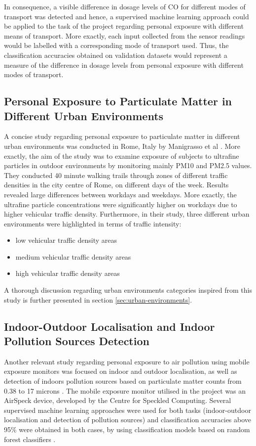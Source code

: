 \documentclass[bsc,frontabs,twoside,singlespacing, parskip,deptreport]{infthesis}     %
\begin{document}
In consequence, a visible difference in dosage levels of CO for different modes of transport was detected and hence, a supervised machine learning approach could be applied to the task of the project regarding personal exposure with different means of transport. More exactly, each input collected from the sensor readings would be labelled with a corresponding mode of transport used. Thus, the classification accuracies obtained on validation datasets would represent a measure of the difference in dosage levels from personal exposure with different modes of transport.

\subsection{Personal Exposure to Particulate Matter in Different Urban Environments}

A concise study regarding personal exposure to particulate matter in different urban environments was conducted in Rome, Italy by Manigrasso et al \cite{rome2017}. More exactly, the aim of the study was to examine exposure of subjects to ultrafine particles in outdoor environments by monitoring mainly PM10 and PM2.5 values. They conducted 40 minute walking trails through zones of different traffic densities in the city centre of Rome, on different days of the week. Results revealed large differences between workdays and weekdays. More exactly, the ultrafine particle concentrations were significantly higher on workdays due to higher vehicular traffic density. Furthermore,  in their study, three different urban environments were highlighted in terms of traffic intensity:
\begin{itemize}
\item low vehicular traffic density areas
\item medium vehicular traffic density areas
\item high vehicular traffic density areas
\end{itemize}
A thorough discussion regarding urban environments categories inspired from this study is further presented in section \ref{sec:urban-environments}.

\subsection{Indoor-Outdoor Localisation and Indoor Pollution Sources Detection}

Another relevant study regarding personal exposure to air pollution using mobile exposure monitors was focused on indoor and outdoor localisation, as well as detection of indoors pollution sources based on particulate matter counts from 0.38 to 17 microns \cite{buzatu2018}. The mobile exposure monitor utilised in the project was an AirSpeck device, developed by the Centre for Speckled Computing. Several supervised machine learning approaches were used for both tasks (indoor-outdoor localisation and detection of pollution sources) and classification accuracies above 95\% were obtained in both cases, by using classification models based on random forest classifiers \cite{randomForest}.
\end{document}
